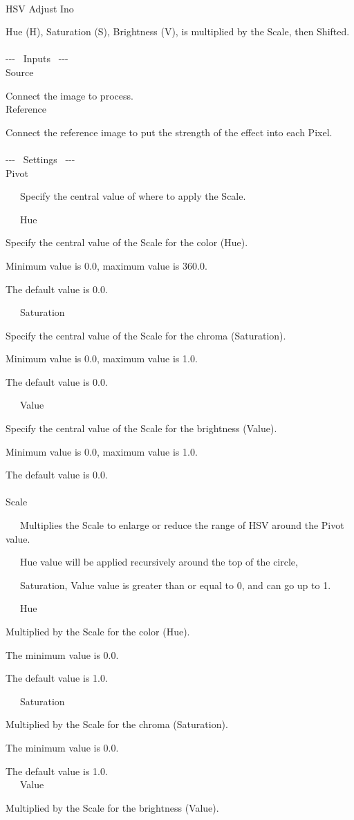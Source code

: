 \documentclass[a4paper,12pt]{article}
\begin{document}
\thispagestyle{empty}

\Large
\noindent \\
HSV Adjust Ino\medskip
\par
\normalsize
Hue (H), Saturation (S), Brightness (V), is multiplied by the Scale, then Shifted.\\
\\
-{-}- \ Inputs \ -{-}-\\
Source\par
Connect the image to process.\\
Reference\par
Connect the reference image to put the strength of the effect into each Pixel.\\
\\
-{-}- \ Settings \ -{-}-\\
Pivot\par
\noindent \ \ \, Specify the central value of where to apply the Scale.\\
\par
\noindent \ \ \, Hue\par
Specify the central value of the Scale for the color (Hue).\par
Minimum value is 0.0, maximum value is 360.0.\par
The default value is 0.0.\par
\noindent \ \ \, Saturation\par
Specify the central value of the Scale for the chroma (Saturation).\par
Minimum value is 0.0, maximum value is 1.0.\par
The default value is 0.0.\par
\noindent \ \ \, Value\par
Specify the central value of the Scale for the brightness (Value).\par
Minimum value is 0.0, maximum value is 1.0.\par
The default value is 0.0.\\
\\
Scale\par
\noindent \ \ \, Multiplies the Scale to enlarge or reduce the range of HSV around the Pivot value.\par
\noindent \ \ \, Hue value will be applied recursively around the top of the circle,\par
\noindent \ \ \, Saturation, Value value is greater than or equal to 0, and can go up to 1.\\
\par
\noindent \ \ \, Hue\par
Multiplied by the Scale for the color (Hue).\par
The minimum value is 0.0.\par
The default value is 1.0.\par
\noindent \ \ \, Saturation\par
Multiplied by the Scale for the chroma (Saturation).\par
The minimum value is 0.0.\par
The default value is 1.0.\\
\noindent \ \ \, Value\par
Multiplied by the Scale for the brightness (Value).
\end{document}
